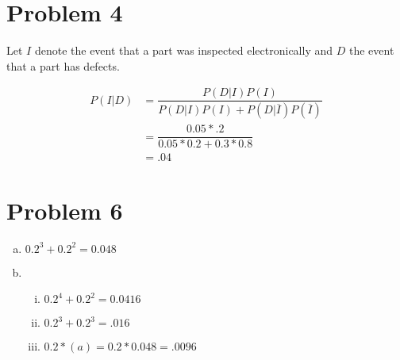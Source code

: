\documentclass[11pt]{article}
\begin{document}
\section*{Problem 4}
Let $I$ denote the event that a part was inspected electronically and $D$ the event that a part has defects.

\begin{align*}
	P(I | D) &= \dfrac{ P(D | I)P(I) }{P(D | I)P(I) + P(D | \overline{I} )P(\overline{I})}\\
	&= \dfrac{0.05 * .2}{ 0.05 * 0.2 + 0.3 * 0.8}\\
	&= .04
\end{align*}

\section*{Problem 6}

\begin{enumerate}[(a)]
	\item $0.2 ^3 + 0.2 ^2 = 0.048$
	
	\item 
		\begin{enumerate}[i.]
			\item $0.2^4 + 0.2^2 = 0.0416$
			\item $0.2^3 + 0.2^3 = .016$
			\item $0.2 * (a) = 0.2 * 0.048 = .0096$
		\end{enumerate}
	
\end{enumerate}
\end{document}
